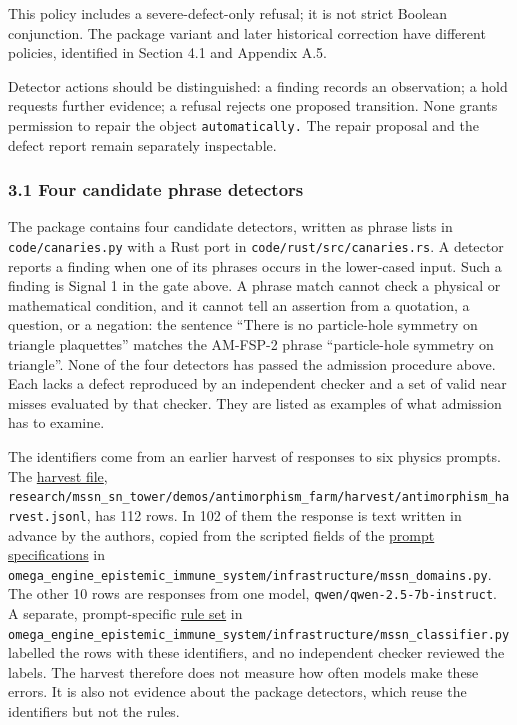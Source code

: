 \documentclass[
  11pt,
]{article}
\begin{document}
This policy includes a severe-defect-only refusal; it is not strict
Boolean conjunction. The package variant and later historical correction
have different policies, identified in Section 4.1 and Appendix A.5.

Detector actions should be distinguished: a finding records an
observation; a hold requests further evidence; a refusal rejects one
proposed transition. None grants permission to repair the object
\nolinkurl{automatically.} The repair proposal and the defect report
remain separately inspectable.

\subsubsection{3.1 Four candidate phrase
detectors}\label{four-candidate-phrase-detectors}

The package contains four candidate detectors, written as phrase lists
in \nolinkurl{code/canaries.py} with a Rust port in
\nolinkurl{code/rust/src/canaries.rs}. A detector reports a finding when
one of its phrases occurs in the lower-cased input. Such a finding is
Signal 1 in the gate above. A phrase match cannot check a physical or
mathematical condition, and it cannot tell an assertion from a
quotation, a question, or a negation: the sentence ``There is no
particle-hole symmetry on triangle plaquettes'' matches the AM-FSP-2
phrase ``particle-hole symmetry on triangle''. None of the four
detectors has passed the admission procedure above. Each lacks a defect
reproduced by an independent checker and a set of valid near misses
evaluated by that checker. They are listed as examples of what admission
has to examine.

The identifiers come from an earlier harvest of responses to six physics
prompts. The
\href{https://github.com/dbccpage/the_symbol_game/blob/52cb5457f6c485ba548cfd292f6012a941ed22cf/research/mssn_sn_tower/demos/antimorphism_farm/harvest/antimorphism_harvest.jsonl}{harvest
file},
\nolinkurl{research/mssn_sn_tower/demos/antimorphism_farm/harvest/antimorphism_harvest.jsonl},
has 112 rows. In 102 of them the response is text written in advance by
the authors, copied from the scripted fields of the
\href{https://github.com/dbccpage/the_symbol_game/blob/52cb5457f6c485ba548cfd292f6012a941ed22cf/omega_engine_epistemic_immune_system/infrastructure/mssn_domains.py}{prompt
specifications} in
\nolinkurl{omega_engine_epistemic_immune_system/infrastructure/mssn_domains.py}.
The other 10 rows are responses from one model,
\nolinkurl{qwen/qwen-2.5-7b-instruct}. A separate, prompt-specific
\href{https://github.com/dbccpage/the_symbol_game/blob/52cb5457f6c485ba548cfd292f6012a941ed22cf/omega_engine_epistemic_immune_system/infrastructure/mssn_classifier.py}{rule
set} in
\nolinkurl{omega_engine_epistemic_immune_system/infrastructure/mssn_classifier.py}
labelled the rows with these identifiers, and no independent checker
reviewed the labels. The harvest therefore does not measure how often
models make these errors. It is also not evidence about the package
detectors, which reuse the identifiers but not the rules.
\end{document}
